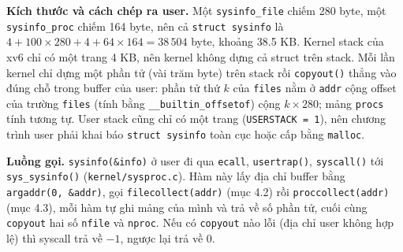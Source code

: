 \textbf{Kích thước và cách chép ra user.} Một \texttt{sysinfo\_file} chiếm 280 byte, một \texttt{sysinfo\_proc} chiếm 164 byte, nên cả \texttt{struct sysinfo} là $4 + 100 \times 280 + 4 + 64 \times 164 = 38\,504$ byte, khoảng 38.5 KB. Kernel stack của xv6 chỉ có một trang 4 KB, nên kernel không dựng cả struct trên stack. Mỗi lần kernel chỉ dựng một phần tử (vài trăm byte) trên stack rồi \texttt{copyout()} thẳng vào đúng chỗ trong buffer của user: phần tử thứ $k$ của \texttt{files} nằm ở \texttt{addr} cộng offset của trường \texttt{files} (tính bằng \texttt{\_\_builtin\_offsetof}) cộng $k \times 280$; mảng \texttt{procs} tính tương tự. User stack cũng chỉ có một trang (\texttt{USERSTACK = 1}), nên chương trình user phải khai báo \texttt{struct sysinfo} toàn cục hoặc cấp bằng \texttt{malloc}.

\textbf{Luồng gọi.} \texttt{sysinfo(\&info)} ở user đi qua \texttt{ecall}, \texttt{usertrap()}, \texttt{syscall()} tới \texttt{sys\_sysinfo()} (\texttt{kernel/sysproc.c}). Hàm này lấy địa chỉ buffer bằng \texttt{argaddr(0, \&addr)}, gọi \texttt{filecollect(addr)} (mục 4.2) rồi \texttt{proccollect(addr)} (mục 4.3), mỗi hàm tự ghi mảng của mình và trả về số phần tử, cuối cùng \texttt{copyout} hai số \texttt{nfile} và \texttt{nproc}. Nếu có \texttt{copyout} nào lỗi (địa chỉ user không hợp lệ) thì syscall trả về $-1$, ngược lại trả về 0.
